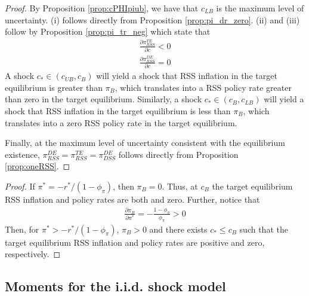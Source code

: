 \documentclass[11pt]{article}
\begin{document}
\begin{singlespace}
		
		
		\propfour*
		
		\begin{proof}
			By Proposition \ref{prop:cPHIpiub}, we have that $c_{LB}$ is the maximum level of uncertainty. (i) follows directly from Proposition \ref{prop:pi_dr_zero}. (ii) and (iii) follow by Proposition \ref{prop:pi_tr_neg} which state that
			\begin{align*}
			\frac{\partial\pi_{RSS}^{TE}}{\partial c} < 0\\
			\frac{\partial\pi_{RSS}^{DE}}{\partial c} = 0
			\end{align*} 
			A shock $c_{*} \in (c_{UB}, c_{B})$ will yield a shock that RSS inflation in the target equilibrium is greater than $\pi_{B}$, which translates into a RSS policy rate  greater than zero in the target equilibrium. Similarly, a shock $c_{*} \in (c_{B}, c_{LB})$ will yield a shock that RSS inflation in the target equilibrium is less than $\pi_{B}$, which translates into a zero RSS policy rate in the target equilibrium.
			
			Finally, at the maximum level of uncertainty consistent with the equilibrium existence, $\pi_{RSS}^{DE} = \pi_{RSS}^{TE} = \pi_{DSS}^{DE}$  follows directly from Proposition \ref{prop:oneRSS}.
		\end{proof}
		
		
		
		\corfour*
		\begin{proof}
			If $\pi^* = -r^*/(1-\phi_{\pi})$, then $\pi_B = 0$. Thus, at $c_B$ the target equilibrium RSS inflation and policy rates are both and zero. 
			Further, notice that 
			\begin{align*}
			\frac{\partial\pi_B}{\partial\pi^*} = -\frac{1-\phi_{\pi}}{\phi_{\pi}} > 0
			\end{align*}
			Then, for $\pi^* > -r^*/(1-\phi_{\pi})$, $\pi_B > 0$ and there exists $c_* \le c_{B}$ such that the target equilibrium RSS inflation and policy rates are positive and zero, respectively.
		\end{proof}
		
		\subsection{Moments for the i.i.d. shock model}
		

\end{singlespace}
\end{document}
